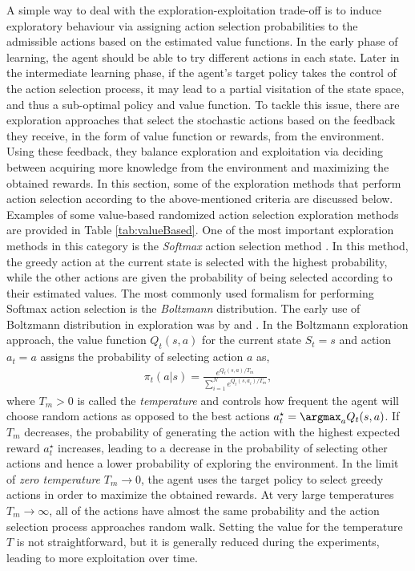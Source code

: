 \label{sec:valuebased}
A simple way to deal with the exploration-exploitation trade-off is to induce exploratory behaviour via assigning action selection probabilities to the admissible actions based on the estimated value functions. In the early phase of learning, the agent should be able to try different actions in each state. Later in the intermediate learning phase, if the agent's target policy takes the control of the action selection process, it may lead to a partial visitation of the state space, and thus a sub-optimal policy and value function. To tackle this issue, there are exploration approaches that select the stochastic actions based on the feedback they receive, in the form of value function or rewards, from the environment. Using these feedback, they balance exploration and exploitation via deciding between acquiring more knowledge from the environment and maximizing the obtained rewards. In this section, some of the exploration methods that perform action selection according to the above-mentioned criteria are discussed below. Examples of some value-based randomized action selection exploration methods are provided in Table \ref{tab:valueBased}.
 One of the most important exploration methods in this category is the \emph{Softmax} action selection method . In this method, the greedy action at the current state is selected with the highest probability, while the other actions are given the probability of being selected according to their estimated values. The most commonly used formalism for performing Softmax action selection is the \emph{Boltzmann} distribution. The early use of Boltzmann distribution in exploration was by  and . In the Boltzmann exploration approach, the value function $Q_t(s,a)$ for the current state $S_t=s$ and action $a_t=a$ assigns the probability of selecting action $a$ as, 
\begin{align}
\pi_t\left(a|s\right)=\frac{e^{Q_t\left(s,a\right)/T_m}}{\sum_{i=1}^{N}e^{Q_t\left(s,a_i\right)/T_m}},\label{eq:Softmax}
\end{align}
where $T_m>0$ is called the \emph{temperature} and controls how frequent the agent will choose random actions as opposed to the best actions $a_t^\star = \argmax_aQ_t(s,a)$. If $T_m$ decreases, the probability of generating the action with the highest expected reward $a_t^\star$ increases, leading to a decrease in the probability of selecting other actions and hence a lower probability of exploring the environment. In the limit of \emph{zero temperature} $T_m\rightarrow0$, the agent uses the target policy to select greedy actions in order to maximize the obtained rewards. At very large temperatures $T_m\rightarrow\infty$, all of the actions have almost the same probability and the action selection process approaches random walk. Setting the value for the temperature $T$ is not straightforward, but it is generally reduced during the experiments, leading to more exploitation over time. 
